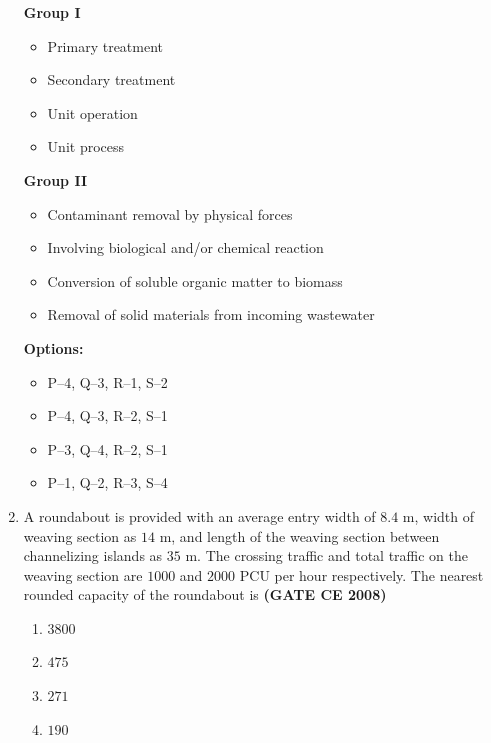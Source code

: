 \documentclass[journal]{IEEEtran}
\begin{document}
\begin{enumerate}
\begin{minipage}[t]{0.45\textwidth}
\textbf{Group I}
\begin{itemize}[align=left]
    \item[P.] Primary treatment
    \item[Q.] Secondary treatment
    \item[R.] Unit operation
    \item[S.] Unit process
\end{itemize}
\end{minipage}
\hfill
\begin{minipage}[t]{0.45\textwidth}
\textbf{Group II}
\begin{itemize}[align=left]
    \item[1.] Contaminant removal by physical forces
    \item[2.] Involving biological and/or chemical reaction
    \item[3.] Conversion of soluble organic matter to biomass
    \item[4.] Removal of solid materials from incoming wastewater
\end{itemize}
\end{minipage}


\textbf{Options:}
\begin{itemize}
    \item[(A)] P--4, Q--3, R--1, S--2
    \item[(B)] P--4, Q--3, R--2, S--1
    \item[(C)] P--3, Q--4, R--2, S--1
    \item[(D)] P--1, Q--2, R--3, S--4
\end{itemize}

\item A roundabout is provided with an average entry width of $8.4$ m, width of weaving section as $14$ m, and length of the weaving section between channelizing islands as $35$ m. The crossing traffic and total traffic on the weaving section are $1000$ and $2000$ PCU per hour respectively. The nearest rounded capacity of the roundabout  is \textbf{(GATE CE 2008)}
\begin{multicols}{2}
\begin{enumerate}
\item $3800$
\item $475$
\item $271$
\item $190$
\end{enumerate}  
\end{multicols}


\end{enumerate}
\end{document}
